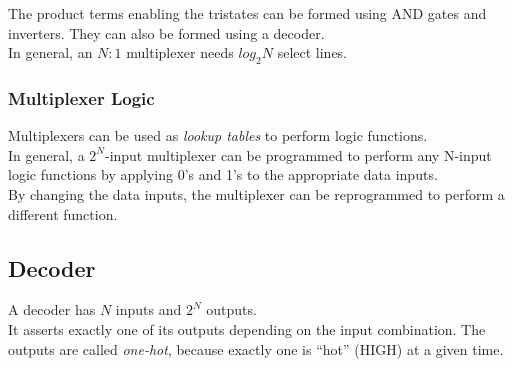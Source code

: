 \documentclass[12pt]{article}
\theoremstyle{definition}
\begin{document}
  The product terms enabling the tristates can be formed using AND gates and inverters.
  They can also be formed using a decoder. \\

  In general, an $N:1$ multiplexer needs $log_{2} N$ select lines.

  \subsubsection{Multiplexer Logic}
  Multiplexers can be used as \emph{lookup tables} to perform logic functions.
 \\
  In general, a $2^{N}$-input multiplexer can be programmed to perform any N-input logic functions by applying 0's and 1's to the appropriate data inputs. \\
  By changing the data inputs, the multiplexer can be reprogrammed to perform a different function.

  \subsection{Decoder}
  A decoder has $N$ inputs and $2^{N}$ outputs. \\
  It asserts exactly one of its outputs depending on the input combination.
  The outputs are called \emph{one-hot}, because exactly one is ``hot'' (HIGH) at a given time. \\
\end{document}
